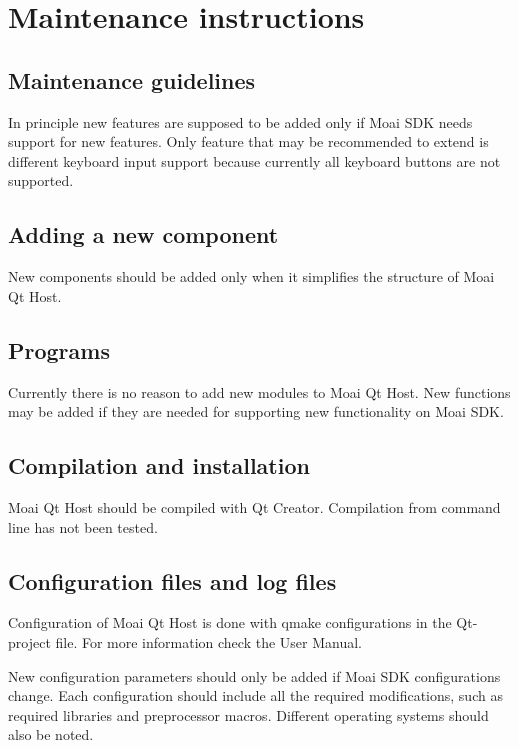 \chapter{Maintenance instructions}

\section{Maintenance guidelines}

In principle new features are supposed to be added only if Moai SDK needs support for new features. Only feature that may be recommended to extend is different keyboard input support because currently all keyboard buttons are not supported. 

\section{Adding a new component}

New components should be added only when it simplifies the structure of Moai Qt Host.

\section{Programs}

Currently there is no reason to add new modules to Moai Qt Host. New functions may be added if they are needed for supporting new functionality on Moai SDK.

\section{Compilation and installation}

Moai Qt Host should be compiled with Qt Creator. 
Compilation from command line has not been tested.

\section{Configuration files and log files}

Configuration of Moai Qt Host is done with qmake configurations in the Qt-project file. For more information check the User Manual.

New configuration parameters should only be added if Moai SDK configurations change. Each configuration should include all the required modifications, such as required libraries and preprocessor macros. Different operating systems should also be noted.

